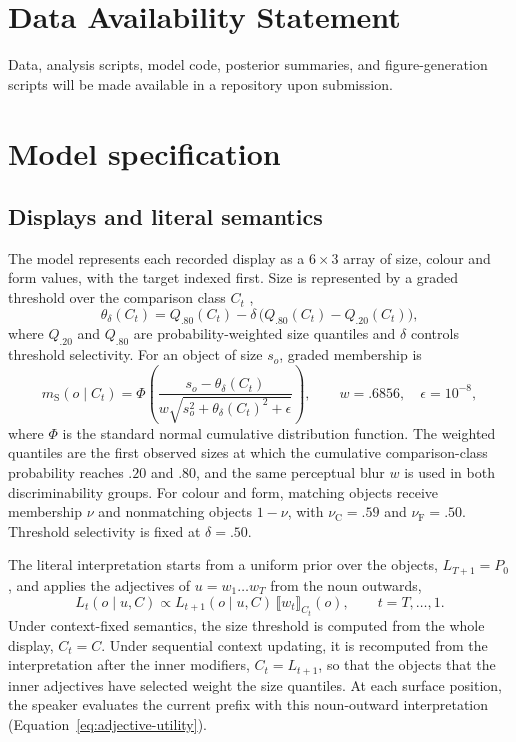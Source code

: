 \documentclass[10pt,a4paper,fleqn]{article}
\begin{document}
\section*{Data Availability Statement}

Data, analysis scripts, model code, posterior summaries, and figure-generation scripts will be made available in a repository upon submission.

\printbibliography

\appendix

\section{Model specification}
\label{app:model}

\subsection{Displays and literal semantics}

The model represents each recorded display as a $6\times3$ array of size, colour and form values, with the target indexed first.
Size is represented by a graded threshold over the comparison class $C_t$ \citep{schmidt2009how,franke2019subjectivity},
\begin{equation}
  \theta_{\delta}(C_t)
  = Q_{.80}(C_t)
    - \delta\,\bigl(Q_{.80}(C_t)-Q_{.20}(C_t)\bigr),
  \label{eq:size-threshold}
\end{equation}
where $Q_{.20}$ and $Q_{.80}$ are probability-weighted size quantiles and $\delta$ controls threshold selectivity.
For an object of size $s_o$, graded membership is
\begin{equation}
 m_{\mathrm S}(o\mid C_t)
 =\Phi\!\left(\frac{s_o-\theta_\delta(C_t)}
 {w\sqrt{s_o^2+\theta_\delta(C_t)^2+\epsilon}}\right),
 \qquad w=.6856,\quad\epsilon=10^{-8},
 \label{eq:size-membership}
\end{equation}
where $\Phi$ is the standard normal cumulative distribution function.
The weighted quantiles are the first observed sizes at which the cumulative comparison-class probability reaches $.20$ and $.80$, and the same perceptual blur $w$ is used in both discriminability groups.
For colour and form, matching objects receive membership $\nu$ and nonmatching objects $1-\nu$, with $\nu_{\mathrm C}=.59$ and $\nu_{\mathrm F}=.50$.
Threshold selectivity is fixed at $\delta=.50$.

The literal interpretation starts from a uniform prior over the objects, $L_{T+1}=P_0$, and applies the adjectives of $u=w_1\ldots w_T$ from the noun outwards,
\begin{equation}
  L_t(o\mid u,C)
  \propto
  L_{t+1}(o\mid u,C)\,
  \llbracket w_t\rrbracket_{C_t}(o),
  \qquad t=T,\ldots,1.
  \label{eq:hierarchical-composition}
\end{equation}
Under context-fixed semantics, the size threshold is computed from the whole display, $C_t=C$.
Under sequential context updating, it is recomputed from the interpretation after the inner modifiers, $C_t=L_{t+1}$, so that the objects that the inner adjectives have selected weight the size quantiles.
At each surface position, the speaker evaluates the current prefix with this noun-outward interpretation (Equation~\ref{eq:adjective-utility}).
\end{document}
